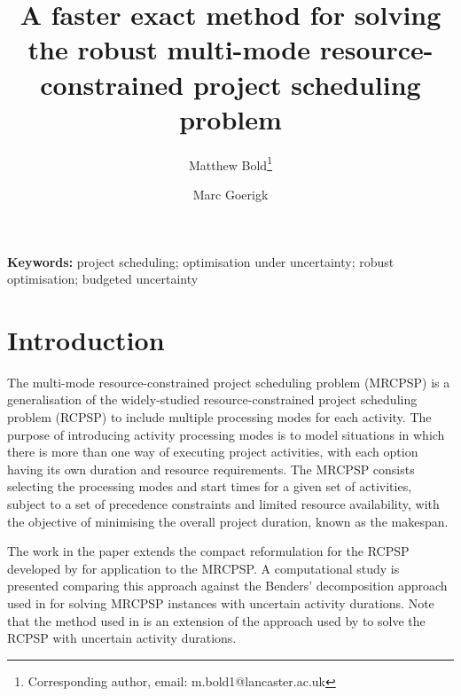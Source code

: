 \documentclass[a4paper,abstracton]{scrartcl}
\begin{document}
\title{A faster exact method for solving the robust multi-mode resource-constrained project scheduling problem}

\author[1]{Matthew Bold\footnote{Corresponding author, email: m.bold1@lancaster.ac.uk}}
\author[2]{Marc Goerigk}


\date{}

\maketitle

\begin{abstract}
\end{abstract}

\noindent\textbf{Keywords:} project scheduling; optimisation under uncertainty; robust optimisation; budgeted uncertainty


\section{Introduction}
The multi-mode resource-constrained project scheduling problem (MRCPSP) is a generalisation of the widely-studied resource-constrained project scheduling problem (RCPSP) to include multiple processing modes for each activity. The purpose of introducing activity processing modes is to model situations in which there is more than one way of executing project activities, with each option having its own duration and resource requirements. The MRCPSP consists selecting the processing modes and start times for a given set of activities, subject to a set of precedence constraints and limited resource availability, with the objective of minimising the overall project duration, known as the makespan.

The work in the paper extends the compact reformulation for the RCPSP developed by \cite{bold2021compact} for application to the MRCPSP. A computational study is presented comparing this approach against the Benders' decomposition approach used in \cite{balouka2021robust} for solving MRCPSP instances with uncertain activity durations. Note that the method used in \cite{balouka2021robust} is an extension of the approach used by \cite{bruni2017adjustable} to solve the RCPSP with uncertain activity durations.
\end{document}
